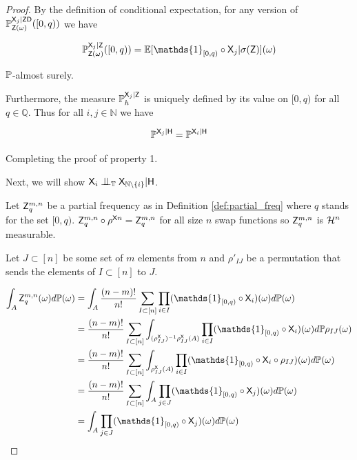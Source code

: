 \begin{proof}
By the definition of conditional expectation, for any version of $\mathbb{P}_{\mathsf{Z}(\omega)}^{\mathsf{X}_j|\mathsf{Z}\mathsf{D}}([0,q))$ we have

\begin{align}
    \prob{P}_{\RV{Z}(\omega)}^{\RV{X}_j|\RV{Z}}([0,q)) &= \mathbb{E}[\mathds{1}_{[0,q)}\circ \RV{X}_j|\sigma(\RV{Z})](\omega)\\
\end{align}

$\mathbb{P}$-almost surely.

Furthermore, the measure $\mathbb{P}_{h}^{\mathsf{X}_j|\mathsf{Z}}$ is uniquely defined by its value on $[0,q)$ for all $q\in \mathbb{Q}$. Thus for all $i,j\in \mathbb{N}$ we have

\begin{align}
    \mathbb{P}^{\mathsf{X}_j|\mathsf{H}} = \mathbb{P}^{\mathsf{X}_i|\mathsf{H}}
\end{align}

Completing the proof of property 1.

Next, we will show $\RV{X}_i\CI_\kernel{T} \RV{X}_{\mathbb{N}\setminus \{i\}} | \RV{H}$.

Let $\mathsf{Z}^{m,n}_q$ be a partial frequency as in Definition \ref{def:partial_freq} where $q$ stands for the set $[0,q)$. $\mathsf{Z}^{m,n}_q\circ \rho^{\mathsf{X}n}=\mathsf{Z}^{m,n}_q$ for all size $n$ swap functions so $\mathsf{Z}^{m,n}_q$  is $\mathcal{H}^n$ measurable.

Let $J\subset[n]$ be some set of $m$ elements from $n$ and $\rho'_{IJ}$ be a permutation that sends the elements of $I\subset[n]$ to $J$.

\begin{align}
    \int_{A} \RV{Z}_q^{m,n} (\omega) d\prob{P}(\omega) &= \int_{A} \frac{(n-m)!}{n!}\sum_{I\subset[n]}\prod_{i\in I} (\mathds{1}_{[0,q)}\circ \RV{X}_i)(\omega)d\prob{P}(\omega)\\
    &= \frac{(n-m)!}{n!}\sum_{I\subset[n]} \int_{(\rho^{\RV{X}}_{IJ})^{-1}\rho^{\RV{X}}_{IJ}(A)} \prod_{i\in I}(\mathds{1}_{[0,q)}\circ \RV{X}_i)(\omega)d\prob{P}\rho_{IJ}(\omega)\label{eq:permutation_invertible}\\
    &= \frac{(n-m)!}{n!}\sum_{I\subset[n]} \int_{\rho^{\RV{X}}_{IJ}(A)} \prod_{i\in I}(\mathds{1}_{[0,q)}\circ \RV{X}_{i}\circ \rho_{IJ}) (\omega)d\prob{P}(\omega)\label{eq:using_pushforward}\\
    &= \frac{(n-m)!}{n!}\sum_{I\subset[n]} \int_{A} \prod_{j\in J}(\mathds{1}_{[0,q)}\circ \RV{X}_{j})(\omega)d\prob{P}(\omega)\label{eq:closure_under_permutation}\\
    &= \int_{A} \prod_{j\in J}(\mathds{1}_{[0,q)} \circ \RV{X}_j)(\omega)d\prob{P}(\omega) \label{eq:cond_expectation_first}
\end{align}


\end{proof}
